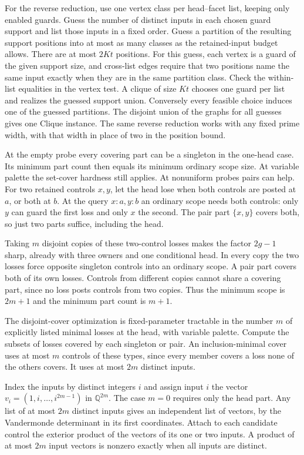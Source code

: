 For the reverse reduction, use one vertex class per
head--facet list, keeping only enabled guards. Guess
the number of distinct inputs in each chosen guard
support and list those inputs in a fixed order.
Guess a partition of the resulting support positions
into at most as many classes as the retained-input
budget allows. There are at most $2Kt$ positions.
For this guess, each vertex is a guard of the given
support size, and cross-list edges require that
two positions name the same input exactly when
they are in the same partition class. Check the
within-list equalities in the vertex test. A clique
of size $Kt$ chooses one guard per list and realizes
the guessed support union. Conversely every feasible
choice induces one of the guessed partitions. The
disjoint union of the graphs for all guesses gives
one Clique instance. The same reverse reduction
works with any fixed prime width, with that width
in place of two in the position bound.

At the empty probe every covering part can be a
singleton in the one-head case. Its minimum part
count then equals its minimum ordinary scope size.
At variable palette the set-cover hardness still
applies.
At nonuniform probes pairs can help.
For two retained controls $x,y$, let
the head lose when both controls
are posted at $a$, or both at $b$.
At the query $x:a,y:b$ an ordinary
scope needs both controls: only $y$
can guard the first loss and only $x$
the second. The pair part $\{x,y\}$
covers both, so just two parts suffice,
including the head.

Taking $m$ disjoint copies of these
two-control losses makes the factor
$2g-1$ sharp, already with three
owners and one conditional head.
In every copy the two losses force
opposite singleton controls into an
ordinary scope. A pair part covers
both of its own losses. Controls from
different copies cannot share a
covering part, since no loss posts
controls from two copies. Thus the
minimum scope is $2m+1$ and the
minimum part count is $m+1$.

The disjoint-cover optimization is
fixed-parameter tractable in the
number $m$ of explicitly listed
minimal losses at the head, with
variable palette. Compute the subsets
of losses covered by each singleton
or pair. An inclusion-minimal cover
uses at most $m$ controls of these
types, since every member covers a
loss none of the others covers. It
uses at most $2m$ distinct inputs.

Index the inputs by distinct integers $i$ and
assign input $i$ the vector
$v_i=(1,i,\ldots,i^{2m-1})$ in $\mathbb Q^{2m}$.
The case $m=0$ requires only the head part.
Any list of at most $2m$ distinct inputs gives an
independent list of vectors, by the Vandermonde
determinant in its first coordinates. Attach to
each candidate control the exterior product of
the vectors of its one or two inputs.
A product of at most $2m$ input vectors is nonzero
exactly when all inputs are distinct.

